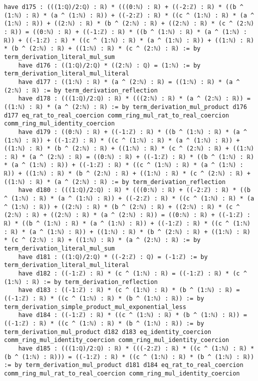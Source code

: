 \documentclass{article}
\begin{document}
\begin{tcolorbox}[colback=white!10, width=\linewidth]
\begin{lstlisting}[language=Lean4]
    have d175 : (((1:ℚ)/2:ℚ) : ℝ) * (((0:ℕ) : ℝ) + ((-2:ℤ) : ℝ) * ((b ^ (1:ℕ) : ℝ) * (a ^ (1:ℕ) : ℝ)) + ((-2:ℤ) : ℝ) * ((c ^ (1:ℕ) : ℝ) * (a ^ (1:ℕ) : ℝ)) + ((2:ℕ) : ℝ) * (b ^ (2:ℕ) : ℝ) + ((2:ℕ) : ℝ) * (c ^ (2:ℕ) : ℝ)) = ((0:ℕ) : ℝ) + ((-1:ℤ) : ℝ) * ((b ^ (1:ℕ) : ℝ) * (a ^ (1:ℕ) : ℝ)) + ((-1:ℤ) : ℝ) * ((c ^ (1:ℕ) : ℝ) * (a ^ (1:ℕ) : ℝ)) + ((1:ℕ) : ℝ) * (b ^ (2:ℕ) : ℝ) + ((1:ℕ) : ℝ) * (c ^ (2:ℕ) : ℝ) := by term_derivation_literal_mul_sum
    have d176 : ((1:ℚ)/2:ℚ) * ((2:ℕ) : ℚ) = (1:ℕ) := by term_derivation_literal_mul_literal
    have d177 : ((1:ℕ) : ℝ) * (a ^ (2:ℕ) : ℝ) = ((1:ℕ) : ℝ) * (a ^ (2:ℕ) : ℝ) := by term_derivation_reflection
    have d178 : (((1:ℚ)/2:ℚ) : ℝ) * (((2:ℕ) : ℝ) * (a ^ (2:ℕ) : ℝ)) = ((1:ℕ) : ℝ) * (a ^ (2:ℕ) : ℝ) := by term_derivation_mul_product d176 d177 eq_rat_to_real_coercion comm_ring_mul_rat_to_real_coercion comm_ring_mul_identity_coercion
    have d179 : ((0:ℕ) : ℝ) + ((-1:ℤ) : ℝ) * ((b ^ (1:ℕ) : ℝ) * (a ^ (1:ℕ) : ℝ)) + ((-1:ℤ) : ℝ) * ((c ^ (1:ℕ) : ℝ) * (a ^ (1:ℕ) : ℝ)) + ((1:ℕ) : ℝ) * (b ^ (2:ℕ) : ℝ) + ((1:ℕ) : ℝ) * (c ^ (2:ℕ) : ℝ) + ((1:ℕ) : ℝ) * (a ^ (2:ℕ) : ℝ) = ((0:ℕ) : ℝ) + ((-1:ℤ) : ℝ) * ((b ^ (1:ℕ) : ℝ) * (a ^ (1:ℕ) : ℝ)) + ((-1:ℤ) : ℝ) * ((c ^ (1:ℕ) : ℝ) * (a ^ (1:ℕ) : ℝ)) + ((1:ℕ) : ℝ) * (b ^ (2:ℕ) : ℝ) + ((1:ℕ) : ℝ) * (c ^ (2:ℕ) : ℝ) + ((1:ℕ) : ℝ) * (a ^ (2:ℕ) : ℝ) := by term_derivation_reflection
    have d180 : (((1:ℚ)/2:ℚ) : ℝ) * (((0:ℕ) : ℝ) + ((-2:ℤ) : ℝ) * ((b ^ (1:ℕ) : ℝ) * (a ^ (1:ℕ) : ℝ)) + ((-2:ℤ) : ℝ) * ((c ^ (1:ℕ) : ℝ) * (a ^ (1:ℕ) : ℝ)) + ((2:ℕ) : ℝ) * (b ^ (2:ℕ) : ℝ) + ((2:ℕ) : ℝ) * (c ^ (2:ℕ) : ℝ) + ((2:ℕ) : ℝ) * (a ^ (2:ℕ) : ℝ)) = ((0:ℕ) : ℝ) + ((-1:ℤ) : ℝ) * ((b ^ (1:ℕ) : ℝ) * (a ^ (1:ℕ) : ℝ)) + ((-1:ℤ) : ℝ) * ((c ^ (1:ℕ) : ℝ) * (a ^ (1:ℕ) : ℝ)) + ((1:ℕ) : ℝ) * (b ^ (2:ℕ) : ℝ) + ((1:ℕ) : ℝ) * (c ^ (2:ℕ) : ℝ) + ((1:ℕ) : ℝ) * (a ^ (2:ℕ) : ℝ) := by term_derivation_literal_mul_sum
    have d181 : ((1:ℚ)/2:ℚ) * ((-2:ℤ) : ℚ) = (-1:ℤ) := by term_derivation_literal_mul_literal
    have d182 : ((-1:ℤ) : ℝ) * (c ^ (1:ℕ) : ℝ) = ((-1:ℤ) : ℝ) * (c ^ (1:ℕ) : ℝ) := by term_derivation_reflection
    have d183 : ((-1:ℤ) : ℝ) * (c ^ (1:ℕ) : ℝ) * (b ^ (1:ℕ) : ℝ) = ((-1:ℤ) : ℝ) * ((c ^ (1:ℕ) : ℝ) * (b ^ (1:ℕ) : ℝ)) := by term_derivation_simple_product_mul_exponential_less
    have d184 : ((-1:ℤ) : ℝ) * ((c ^ (1:ℕ) : ℝ) * (b ^ (1:ℕ) : ℝ)) = ((-1:ℤ) : ℝ) * ((c ^ (1:ℕ) : ℝ) * (b ^ (1:ℕ) : ℝ)) := by term_derivation_mul_product d182 d183 eq_identity_coercion comm_ring_mul_identity_coercion comm_ring_mul_identity_coercion
    have d185 : (((1:ℚ)/2:ℚ) : ℝ) * (((-2:ℤ) : ℝ) * ((c ^ (1:ℕ) : ℝ) * (b ^ (1:ℕ) : ℝ))) = ((-1:ℤ) : ℝ) * ((c ^ (1:ℕ) : ℝ) * (b ^ (1:ℕ) : ℝ)) := by term_derivation_mul_product d181 d184 eq_rat_to_real_coercion comm_ring_mul_rat_to_real_coercion comm_ring_mul_identity_coercion

\end{lstlisting}
\end{tcolorbox}
\end{document}
